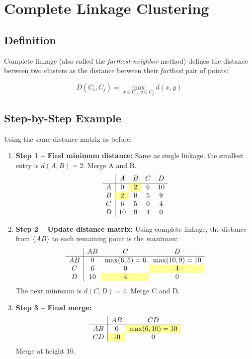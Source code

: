\documentclass{article}
\begin{document}
\section{Complete Linkage Clustering}

\subsection{Definition}

Complete linkage (also called the \textit{farthest-neighbor} method) defines the distance between two clusters as the distance between their \emph{farthest} pair of points:

\[
D(C_i, C_j) = \max_{x \in C_i,\; y \in C_j} d(x, y)
\]

\subsection{Step-by-Step Example}

Using the same distance matrix as before:

\begin{enumerate}
    \item \textbf{Step 1 -- Find minimum distance:} Same as single linkage, the smallest entry is $d(A,B) = 2$. Merge A and B.
    \[
    \begin{array}{c|cccc}
        & A & B & C & D \\
    \hline
    A & 0 & \cellcolor{highlight}2 & 6 & 10 \\
    B & \cellcolor{highlight}2 & 0 & 5 & 9  \\
    C & 6 & 5 & 0 & 4  \\
    D & 10 & 9 & 4 & 0  \\
    \end{array}
    \]

    \item \textbf{Step 2 -- Update distance matrix:} Using complete linkage, the distance from $\{AB\}$ to each remaining point is the \emph{maximum}:
    \[
    \begin{array}{c|ccc}
        & AB & C & D \\
    \hline
    AB & 0 & \max(6,5)=6 & \max(10,9)=10 \\
    C  & 6 & 0 & \cellcolor{highlight}4 \\
    D  & 10 & \cellcolor{highlight}4 & 0 \\
    \end{array}
    \]
    The next minimum is $d(C,D) = 4$. Merge C and D.

    \item \textbf{Step 3 -- Final merge:}
    \[
    \begin{array}{c|cc}
        & AB & CD \\
    \hline
    AB & 0 & \cellcolor{highlight}{\max(6,10)=10} \\
    CD & \cellcolor{highlight}{10} & 0 \\
    \end{array}
    \]
    Merge at height 10.
\end{enumerate}
\end{document}
